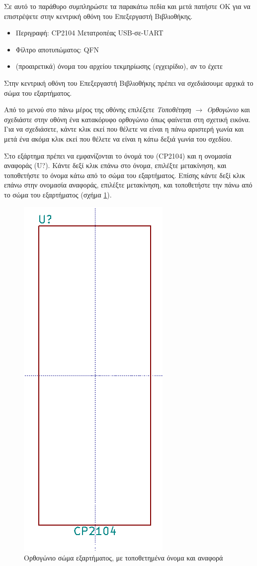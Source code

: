 \documentclass[a4paper]{article}
\begin{document}
Σε αυτό το παράθυρο συμπληρώστε τα παρακάτω πεδία και μετά πατήστε ΟΚ για να επιστρέψετε στην κεντρική οθόνη του Επεξεργαστή Βιβλιοθήκης.

\begin{itemize}
    \item Περιγραφή: CP2104 Μετατροπέας USB-σε-UART
    \item Φίλτρο αποτυπώματος: QFN
    \item (προαιρετικά) όνομα του αρχείου τεκμηρίωσης (εγχειρίδιο), αν το έχετε
\end{itemize}

Στην κεντρική οθόνη του Επεξεργαστή Βιβλιοθήκης πρέπει να σχεδιάσουμε αρχικά το σώμα του εξαρτήματος. 

Από το μενού στο πάνω μέρος της οθόνης επιλέξετε \textit{Τοποθέτηση $\rightarrow$ Ορθογώνιο} και σχεδιάστε στην οθόνη ένα κατακόρυφο ορθογώνιο όπως φαίνεται στη σχετική εικόνα. Για να σχεδιάσετε, κάντε κλικ εκεί που θέλετε να είναι η πάνω αριστερή γωνία και μετά ένα ακόμα κλικ εκεί που θέλετε να είναι η κάτω δεξιά γωνία του σχεδίου.

Στο εξάρτημα πρέπει να εμφανίζονται το όνομά του (CP2104) και η ονομασία αναφοράς (U?). Κάντε δεξί κλικ επάνω στο όνομα, επιλέξτε μετακίνηση, και τοποθετήστε το όνομα κάτω από το σώμα του εξαρτήματος. Επίσης κάντε δεξί κλικ επάνω στην ονομασία αναφοράς, επιλέξτε μετακίνηση, και τοποθετήστε την πάνω από το σώμα του εξαρτήματος (σχήμα \ref{fig:libed-circ-body}). 

\begin{figure}
  \begin{center}
    \includegraphics[width=.2\textwidth]{img/libed-circ-body.png}
    \caption{Ορθογώνιο σώμα εξαρτήματος, με τοποθετημένα όνομα και αναφορά}
    \label{fig:libed-circ-body}
  \end{center}
\end{figure}
\end{document}
